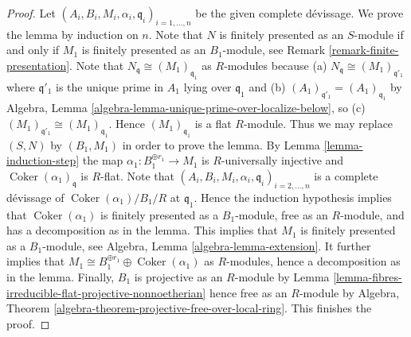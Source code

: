 \documentclass[10pt,a4paper]{amsart}
\theoremstyle{plain}
\theoremstyle{definition}
\theoremstyle{remark}
\numberwithin{equation}{subsection}
\def\Coker{\mathop{\mathrm{Coker}}}
\begin{document}
\begin{proof}
Let $(A_i, B_i, M_i, \alpha_i, \mathfrak q_i)_{i = 1, \ldots, n}$
be the given complete d\'evissage. We prove the lemma by induction on $n$.
Note that $N$ is finitely presented as an $S$-module if and only if
$M_1$ is finitely presented as an $B_1$-module, see
Remark \ref{remark-finite-presentation}.
Note that $N_{\mathfrak q} \cong (M_1)_{\mathfrak q_1}$ as $R$-modules
because (a) $N_{\mathfrak q} \cong (M_1)_{\mathfrak q'_1}$ where
$\mathfrak q'_1$ is the unique prime in $A_1$ lying over $\mathfrak q_1$
and (b) $(A_1)_{\mathfrak q'_1} = (A_1)_{\mathfrak q_1}$ by
Algebra, Lemma \ref{algebra-lemma-unique-prime-over-localize-below},
so (c) $(M_1)_{\mathfrak q'_1} \cong (M_1)_{\mathfrak q_1}$.
Hence $(M_1)_{\mathfrak q_1}$ is a flat $R$-module. Thus we may replace
$(S, N)$ by $(B_1, M_1)$ in order to prove the lemma. By
Lemma \ref{lemma-induction-step}
the map $\alpha_1 : B_1^{\oplus r_1} \to M_1$ is $R$-universally injective
and $\Coker(\alpha_1)_{\mathfrak q}$ is $R$-flat.
Note that $(A_i, B_i, M_i, \alpha_i, \mathfrak q_i)_{i = 2, \ldots, n}$
is a complete d\'evissage of $\Coker(\alpha_1)/B_1/R$ at
$\mathfrak q_1$. Hence the induction hypothesis
implies that $\Coker(\alpha_1)$ is finitely presented as a
$B_1$-module, free as an $R$-module, and has a decomposition as in the lemma.
This implies that $M_1$ is finitely presented as a $B_1$-module, see
Algebra, Lemma \ref{algebra-lemma-extension}.
It further implies that
$M_1 \cong B_1^{\oplus r_1} \oplus \Coker(\alpha_1)$
as $R$-modules, hence a decomposition as in the lemma.
Finally, $B_1$ is projective as an $R$-module by
Lemma \ref{lemma-fibres-irreducible-flat-projective-nonnoetherian}
hence free as an $R$-module by
Algebra, Theorem \ref{algebra-theorem-projective-free-over-local-ring}.
This finishes the proof.
\end{proof}
\end{document}
